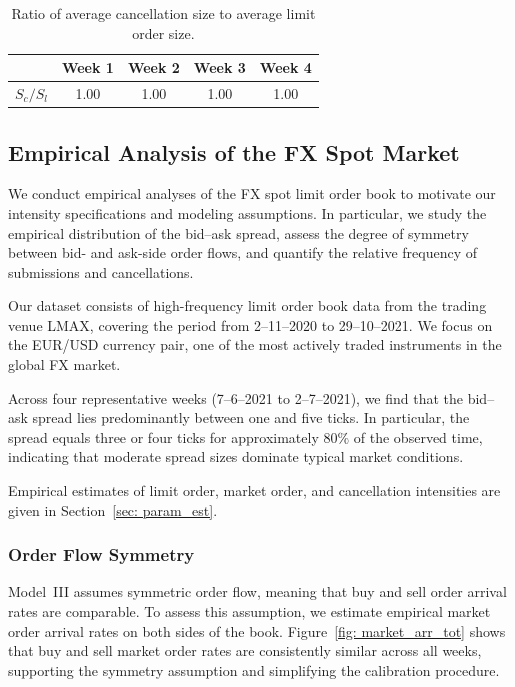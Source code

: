 \documentclass[11pt]{article}
\begin{document}
\begin{table}[h]
    \centering
    \begin{tabular}{r c c c c}\toprule
        & Week 1 & Week 2 & Week 3 & Week 4\\ \midrule
        $S_c / S_l$ & 1.00 & 1.00 & 1.00 & 1.00 \\ \bottomrule
    \end{tabular}
    \caption{Ratio of average cancellation size to average limit order size.}
    \label{tab: can_lim_ratio}
\end{table}

\subsection{Empirical Analysis of the FX Spot Market}\label{sec:data_analysis}

We conduct empirical analyses of the FX spot limit order book to motivate our intensity specifications and modeling assumptions. In particular, we study the empirical distribution of the bid--ask spread, assess the degree of symmetry between bid- and ask-side order flows, and quantify the relative frequency of submissions and cancellations.

Our dataset consists of high-frequency limit order book data from the trading venue LMAX, covering the period from 2--11--2020 to 29--10--2021. We focus on the EUR/USD currency pair, one of the most actively traded instruments in the global FX market.

Across four representative weeks (7--6--2021 to 2--7--2021), we find that the bid--ask spread lies predominantly between one and five ticks. In particular, the spread equals three or four ticks for approximately $80\%$ of the observed time, indicating that moderate spread sizes dominate typical market conditions.

Empirical estimates of limit order, market order, and cancellation intensities are given in Section~\ref{sec: param_est}.

\subsubsection{Order Flow Symmetry}

Model~III assumes symmetric order flow, meaning that buy and sell order arrival rates are comparable. To assess this assumption, we estimate empirical market order arrival rates on both sides of the book. Figure~\ref{fig: market_arr_tot} shows that buy and sell market order rates are consistently similar across all weeks, supporting the symmetry assumption and simplifying the calibration procedure.
\end{document}
